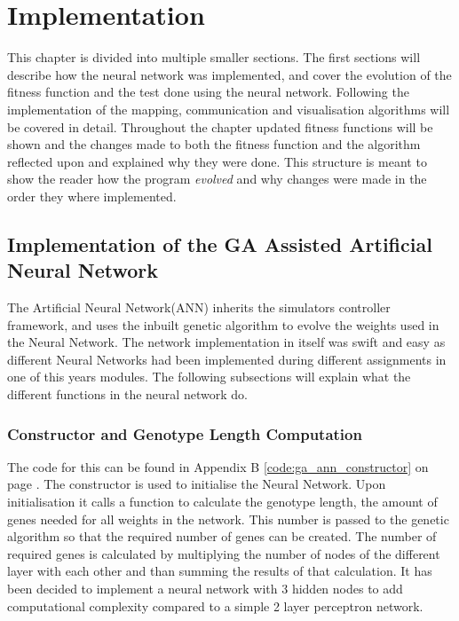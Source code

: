 \chapter{Implementation}
This chapter is divided into multiple smaller sections. 
The first sections will describe how the neural network was implemented, and cover the evolution of the fitness function and the test done using the neural network. 
Following the implementation of the mapping, communication and visualisation algorithms will be covered in detail. Throughout the chapter updated fitness functions will be shown and the changes made to both the fitness function and the algorithm reflected upon and explained why they were done. 
This structure is meant to show the reader how the program \textit{evolved} and why changes were made in the order they where implemented. \\

\section{Implementation of the GA Assisted Artificial Neural Network}
The Artificial Neural Network(ANN) inherits the simulators controller framework, and uses the inbuilt genetic algorithm to evolve the weights used in the Neural Network.
The network implementation in itself was swift and easy as different Neural Networks had been implemented during different assignments in one of this years modules. 
The following subsections will explain what the different functions in the neural network do.

\subsection{Constructor and Genotype Length Computation}
\label{chap3:ga_ann_constructor}
The code for this can be found in Appendix B \ref{code:ga_ann_constructor} on page \pageref{code:ga_ann_constructor}.
The constructor is used to initialise the Neural Network. Upon initialisation it calls a function to calculate the genotype length, the amount of genes needed for all weights in the network. This number is passed to the genetic algorithm so that the required number of genes can be created.
The number of required genes is calculated by multiplying the number of nodes of the different layer with each other and than summing the results of that calculation. 
It has been decided to implement a neural network with 3 hidden nodes to add computational complexity compared to a simple 2 layer perceptron network.

